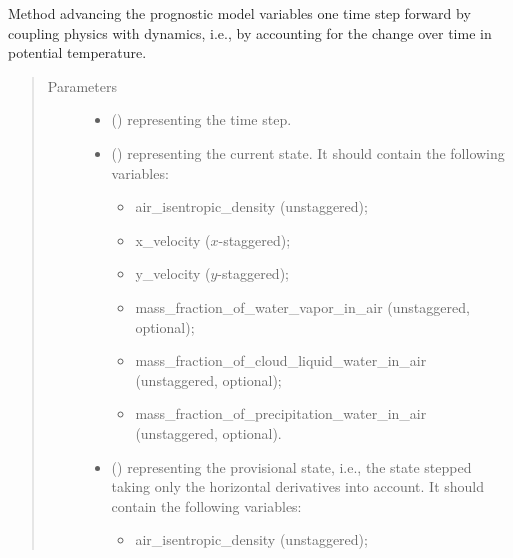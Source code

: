 \documentclass[letterpaper,10pt,english]{sphinxmanual}
\begin{document}
\begin{fulllineitems}
\begin{fulllineitems}
\label{\detokenize{api:tasmania.dycore.prognostic_isentropic_nonconservative.PrognosticIsentropicNonconservative.step_coupling_physics_with_dynamics}}
Method advancing the prognostic model variables one time step forward by coupling physics with
dynamics, i.e., by accounting for the change over time in potential temperature.
\begin{quote}\begin{description}
\item[{Parameters}] \leavevmode\begin{itemize}
\item {} 
 () \textendash{}  representing the time step.

\item {} 
 () \textendash{} 
{\hyperref[\detokenize{api:tasmania.storages.state_isentropic.StateIsentropic}]{}} representing the current state.
It should contain the following variables:
\begin{itemize}
\item {} 
air\_isentropic\_density (unstaggered);

\item {} 
x\_velocity (\(x\)-staggered);

\item {} 
y\_velocity (\(y\)-staggered);

\item {} 
mass\_fraction\_of\_water\_vapor\_in\_air (unstaggered, optional);

\item {} 
mass\_fraction\_of\_cloud\_liquid\_water\_in\_air (unstaggered, optional);

\item {} 
mass\_fraction\_of\_precipitation\_water\_in\_air (unstaggered, optional).

\end{itemize}


\item {} 
 () \textendash{} 
{\hyperref[\detokenize{api:tasmania.storages.state_isentropic.StateIsentropic}]{}} representing the provisional state, i.e.,
the state stepped taking only the horizontal derivatives into account.
It should contain the following variables:
\begin{itemize}
\item {} 
air\_isentropic\_density (unstaggered);


\end{itemize}
\end{itemize}
\end{description}
\end{quote}
\end{fulllineitems}
\end{fulllineitems}
\end{document}
